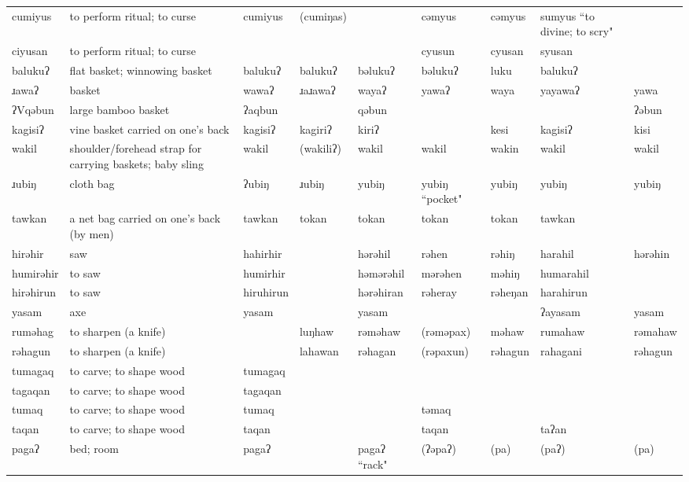 \begin{landscape}
\begin{longtable}{*{9}{p{}}}
\text{*}cumiyus & to perform ritual; to curse & cumiyus & (cumiŋas) &  & cəmyus & cəmyus & sumyus ``to divine; to scry" & \\
\text{*}ciyusan & to perform ritual; to curse &  &  &  & cyusun & cyusan & syusan & \\
\text{*}balukuʔ & flat basket; winnowing basket & balukuʔ & balukuʔ & bəlukuʔ & bəlukuʔ & luku & balukuʔ & \\
\text{*}ɹawaʔ & basket & wawaʔ & ɹaɹawaʔ & wayaʔ & yawaʔ & waya & yayawaʔ & yawa\\
\text{*}ʔVqəbun & large bamboo basket & ʔaqbun &  & qəbun &  &  &  & ʔəbun\\
\text{*}kagisiʔ & vine basket carried on one's back & kagisiʔ & kagiriʔ & kiriʔ &  & kesi & kagisiʔ & kisi\\
\text{*}wakil & shoulder/forehead strap for carrying baskets; baby sling & wakil & (wakiliʔ) & wakil & wakil & wakin & wakil & wakil\\
\text{*}ɹubiŋ & cloth bag & ʔubiŋ & ɹubiŋ & yubiŋ & yubiŋ ``pocket" & yubiŋ & yubiŋ & yubiŋ\\
\text{*}tawkan & a net bag carried on one's back (by men) & tawkan & tokan & tokan & tokan & tokan & tawkan & \\
\text{*}hirəhir & saw & hahirhir &  & hərəhil & rəhen & rəhiŋ & harahil & hərəhin\\
\text{*}humirəhir & to saw & humirhir &  & həmərəhil & mərəhen & məhiŋ & humarahil & \\
\text{*}hirəhirun & to saw & hiruhirun &  & hərəhiran & rəheray & rəheŋan & harahirun & \\
\text{*}yasam & axe & yasam &  & yasam &  &  & ʔayasam & yasam\\
\text{*}ruməhag & to sharpen (a knife) &  & luŋhaw & rəməhaw & (rəməpax) & məhaw & rumahaw & rəmahaw\\
\text{*}rəhagun & to sharpen (a knife) &  & lahawan & rəhagan & (rəpaxun) & rəhagun & rahagani & rəhagun\\
\text{*}tumagaq & to carve; to shape wood & tumagaq &  &  &  &  &  & \\
\text{*}tagaqan & to carve; to shape wood & tagaqan &  &  &  &  &  & \\
\text{*}tumaq & to carve; to shape wood & tumaq &  &  & təmaq &  &  & \\
\text{*}taqan & to carve; to shape wood & taqan &  &  & taqan &  & taʔan & \\
\text{*}pagaʔ & bed; room & pagaʔ &  & pagaʔ ``rack" & (ʔəpaʔ) & (pa) & (paʔ) & (pa)\\

\end{longtable}
\end{landscape}
